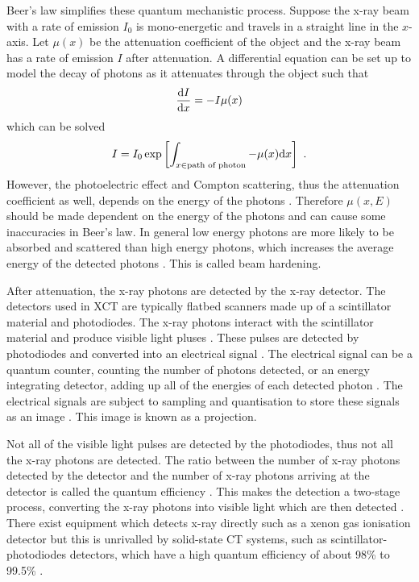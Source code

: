 Beer's law simplifies these quantum mechanistic process. Suppose the x-ray beam with a rate of emission $I_0$ is mono-energetic and travels in a straight line in the $x$-axis. Let $\mu(x)$ be the attenuation coefficient of the object and the x-ray beam has a rate of emission $I$ after attenuation. A differential equation can be set up to model the decay of photons as it attenuates through the object such that
\begin{equation}
\dfrac{\mathrm{d} I}{\mathrm{d} x} = -I\mu(x)
\end{equation}
which can be solved
\begin{equation}
I = I_0\exp\left[\int_{x \in \text{path of photon}}-\mu(x)\mathrm{d} x\right] \ .
\label{eq:beerLaw}
\end{equation}
However, the photoelectric effect and Compton scattering, thus the attenuation coefficient as well, depends on the energy of the photons \citep{elbakri2002statistical}. Therefore $\mu(x,E)$ should be made dependent on the energy of the photons \citep{cantatore2011introduction} and can cause some inaccuracies in Beer's law. In general low energy photons are more likely to be absorbed and scattered than high energy photons, which increases the average energy of the detected photons \citep{sun2012overview}. This is called beam hardening.

After attenuation, the x-ray photons are detected by the x-ray detector. The detectors used in XCT are typically flatbed scanners made up of a scintillator material \citep{curran1953luminescence, greskovich1997ceramic} and photodiodes. The x-ray photons interact with the scintillator material and produce visible light pluses \citep{rossner1993conversion}. These pulses are detected by photodiodes and converted into an electrical signal \citep{nikl2006scintillation, ren2018tutorial}. The electrical signal can be a quantum counter, counting the number of photons detected, or an energy integrating detector, adding up all of the energies of each detected photon \citep{nikl2006scintillation, whiting2006properties, kruth2011computed, ren2018tutorial}. The electrical signals are subject to sampling and quantisation to store these signals as an image \citep{cierniak2011x}. This image is known as a projection.

Not all of the visible light pulses are detected by the photodiodes, thus not all the x-ray photons are detected. The ratio between the number of x-ray photons detected by the detector and the number of x-ray photons arriving at the detector is called the quantum efficiency \citep{cierniak2011x, ren2018tutorial}. This makes the detection a two-stage process, converting the x-ray photons into visible light which are then detected \citep{cierniak2011x}. There exist equipment which detects x-ray directly such as a xenon gas ionisation detector \citep{fuchs2000direct} but this is unrivalled by solid-state CT systems, such as scintillator-photodiodes detectors, which have a high quantum efficiency of about 98\% to 99.5\% \citep{hsieh2000investigation}.

